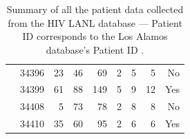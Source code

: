 \documentclass[12pt]{article}
\begin{document}
\begin{table}[!ht]
\begin{center}
\begin{tabular}{llrrrrrrr}
& 34396 &      23 &       46 &       69 &        2 &        5 &        5 &   No \\ 
& 34399 &      61 &       88 &      149 &        5 &        9 &       12 &   Yes \\ 
& 34408 &       5 &       73 &       78 &        2 &        8 &        8 &    No \\ 
& 34410 &      35 &       60 &       95 &        2 &        6 &        6 &    Yes \\ 
\end{tabular}
\end{center}
  \caption{Summary of all the patient data collected from the HIV LANL database --- Patient ID corresponds to the Los Alamos database's Patient ID \citep{LosAlamos}.
   }\label{tab:patients} 
\end{table}
\end{document}
